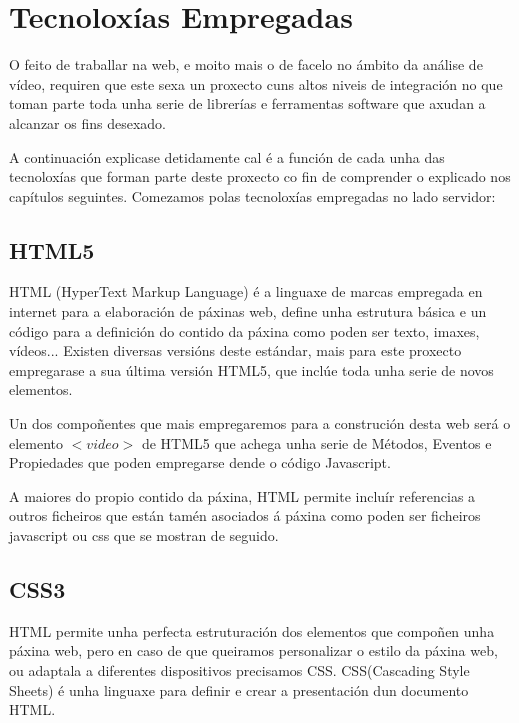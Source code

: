 \chapter{Tecnoloxías Empregadas}
    
    O feito de traballar na web, e moito mais o de facelo no ámbito da análise de vídeo, requiren 
    que este sexa un proxecto cuns altos niveis de integración no que toman parte toda unha serie 
    de librerías e ferramentas software que axudan a alcanzar os fins desexado.
    
    A continuación explicase detidamente cal é a función de cada unha das tecnoloxías que forman 
    parte deste proxecto co fin de comprender o explicado nos capítulos seguintes. Comezamos polas
    tecnoloxías empregadas no lado servidor:
    
    \section{HTML5}
        HTML (HyperText Markup Language) é a linguaxe de marcas empregada en internet para a elaboración
        de páxinas web, define unha estrutura básica e un código para a definición do contido da páxina
        como poden ser texto, imaxes, vídeos... Existen diversas versións deste estándar, mais para este
        proxecto empregarase a sua última versión HTML5, que inclúe toda unha serie de novos elementos.
        
        Un dos compoñentes que mais empregaremos para a construción desta web será o elemento 
        $<video>$ de HTML5 que achega unha serie de Métodos, Eventos e Propiedades
        \cite{w3school-video-events} que poden empregarse dende o código Javascript.
        
        A maiores do propio contido da páxina, HTML permite incluír referencias a outros ficheiros que 
        están tamén asociados á páxina como poden ser ficheiros javascript ou css que se mostran de 
        seguido.
    
    \section{CSS3}
        HTML permite unha perfecta estruturación dos elementos que compoñen unha páxina web, pero 
        en caso de que queiramos personalizar o estilo da páxina web, ou adaptala a diferentes 
        dispositivos precisamos CSS. CSS(Cascading Style Sheets) é unha linguaxe para definir e 
        crear a presentación dun documento HTML.
        
